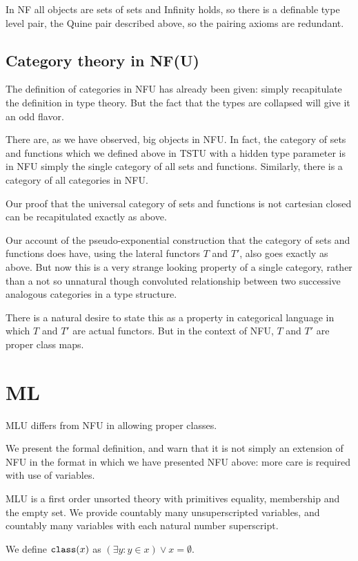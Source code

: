 \documentclass[12pt]{article}
\begin{document}
In NF all objects are sets of sets and Infinity holds, so there is a definable type level pair, the Quine pair described above, so the pairing axioms are redundant.

\subsection{Category theory in NF(U)}

The definition of categories in NFU has already been given:  simply recapitulate the definition in type theory.  But the fact that the types are collapsed will give it an odd flavor.

There are, as we have observed, big objects in NFU.  In fact, the category of sets and functions which we defined above in TSTU with a hidden type parameter is in NFU simply the single category of all sets and functions.  Similarly, there is a category of all categories in NFU.

Our proof that the universal category of sets and functions is not cartesian closed can be recapitulated exactly as above.

Our account of the pseudo-exponential construction that the category of sets and functions does have, using the lateral functors $T$ and $T'$, also goes exactly as above.  But now this is a very strange looking property of a single category, rather than a not so unnatural though convoluted relationship between two successive analogous categories in a type structure.

There is a natural desire to state this as a property in categorical language in which $T$ and $T'$ are actual functors.  But in the context of NFU, $T$ and $T'$ are proper class maps.

\section{ML}

MLU differs from NFU in allowing proper classes.  

We present the formal definition, and warn that it is not simply an extension of NFU in the format in which we have presented NFU above:  more care is required with use of variables.

MLU is a first order unsorted theory with primitives equality, membership and the empty set.  We provide countably many unsuperscripted variables, and countably many variables with each
natural number superscript.

We define ${\tt class}(x)$ as $(\exists y:y \in x) \vee x = \emptyset$.
\end{document}
